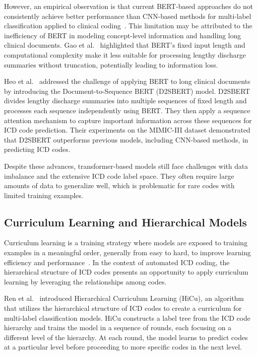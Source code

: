 \documentclass[12pt,a4paper]{report}
\begin{document}
However, an empirical observation is that current BERT-based approaches do not consistently achieve better performance than CNN-based methods for multi-label classification applied to clinical coding~\cite{dong2022automated, gao2021limitations}. This limitation may be attributed to the inefficiency of BERT in modeling concept-level information and handling long clinical documents. Gao et al.~\cite{gao2021limitations} highlighted that BERT's fixed input length and computational complexity make it less suitable for processing lengthy discharge summaries without truncation, potentially leading to information loss.

Heo et al.~\cite{heo2022medical} addressed the challenge of applying BERT to long clinical documents by introducing the Document-to-Sequence BERT (D2SBERT) model. D2SBERT divides lengthy discharge summaries into multiple sequences of fixed length and processes each sequence independently using BERT. They then apply a sequence attention mechanism to capture important information across these sequences for ICD code prediction. Their experiments on the MIMIC-III dataset demonstrated that D2SBERT outperforms previous models, including CNN-based methods, in predicting ICD codes.

Despite these advances, transformer-based models still face challenges with data imbalance and the extensive ICD code label space. They often require large amounts of data to generalize well, which is problematic for rare codes with limited training examples.

\subsection{Curriculum Learning and Hierarchical Models}

Curriculum learning is a training strategy where models are exposed to training examples in a meaningful order, generally from easy to hard, to improve learning efficiency and performance~\cite{bengio2009curriculum}. In the context of automated ICD coding, the hierarchical structure of ICD codes presents an opportunity to apply curriculum learning by leveraging the relationships among codes.

Ren et al.~\cite{ren2022hicu} introduced Hierarchical Curriculum Learning (HiCu), an algorithm that utilizes the hierarchical structure of ICD codes to create a curriculum for multi-label classification models. HiCu constructs a label tree from the ICD code hierarchy and trains the model in a sequence of rounds, each focusing on a different level of the hierarchy. At each round, the model learns to predict codes at a particular level before proceeding to more specific codes in the next level.
\end{document}
